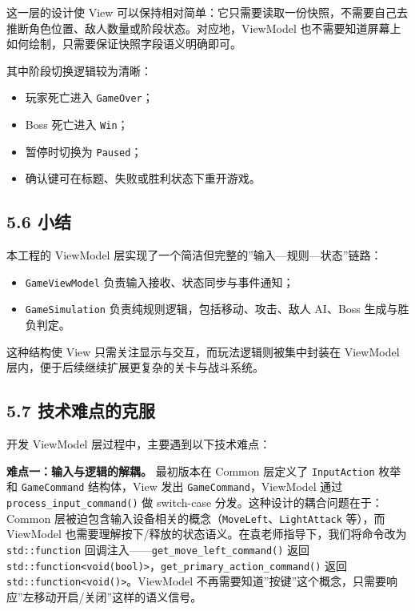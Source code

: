 \documentclass[12pt,fontset=none]{ctexart}
\begin{document}
这一层的设计使 View 可以保持相对简单：它只需要读取一份快照，不需要自己去推断角色位置、敌人数量或阶段状态。对应地，ViewModel 也不需要知道屏幕上如何绘制，只需要保证快照字段语义明确即可。

其中阶段切换逻辑较为清晰：

\begin{itemize}
\item 玩家死亡进入 \texttt{GameOver}；
\item Boss 死亡进入 \texttt{Win}；
\item 暂停时切换为 \texttt{Paused}；
\item 确认键可在标题、失败或胜利状态下重开游戏。
\end{itemize}

\subsection{5.6 小结}

本工程的 ViewModel 层实现了一个简洁但完整的”输入—规则—状态”链路：

\begin{itemize}
\item \texttt{GameViewModel} 负责输入接收、状态同步与事件通知；
\item \texttt{GameSimulation} 负责纯规则逻辑，包括移动、攻击、敌人 AI、Boss 生成与胜负判定。
\end{itemize}

这种结构使 View 只需关注显示与交互，而玩法逻辑则被集中封装在 ViewModel 层内，便于后续继续扩展更复杂的关卡与战斗系统。

\subsection{5.7 技术难点的克服}

开发 ViewModel 层过程中，主要遇到以下技术难点：

\textbf{难点一：输入与逻辑的解耦。} 最初版本在 Common 层定义了 \texttt{InputAction} 枚举和 \texttt{GameCommand} 结构体，View 发出 \texttt{GameCommand}，ViewModel 通过 \texttt{process\_input\_command()} 做 switch-case 分发。这种设计的耦合问题在于：Common 层被迫包含输入设备相关的概念（\texttt{MoveLeft}、\texttt{LightAttack} 等），而 ViewModel 也需要理解按下/释放的状态语义。在袁老师指导下，我们将命令改为 \texttt{std::function} 回调注入——\texttt{get\_move\_left\_command()} 返回 \texttt{std::function<void(bool)>}，\texttt{get\_primary\_action\_command()} 返回 \texttt{std::function<void()>}。ViewModel 不再需要知道”按键”这个概念，只需要响应”左移动开启/关闭”这样的语义信号。
\end{document}
